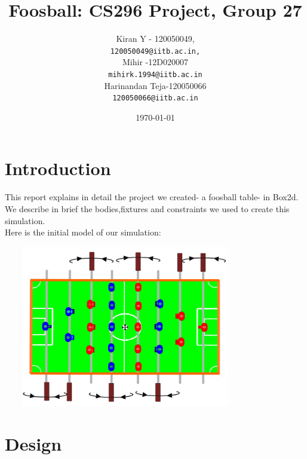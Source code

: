 \documentclass{article}
\begin{document}
\nocite{*}

\title{Foosball: CS296 Project, Group 27}

\author{
Kiran Y - 120050049,\\
\texttt{120050049@iitb.ac.in,}\\
Mihir -12D020007\\
\texttt{mihirk.1994@iitb.ac.in}\\
Harinandan Teja-120050066\\
\texttt{120050066@iitb.ac.in}\\
}
\date{\today}

\maketitle

\section{Introduction}
This report explains in detail the project we created- a foosball table- in Box2d. We describe in brief the bodies,fixtures and constraints we used to create this simulation.\\
Here is the initial model of our simulation:\\
\begin{center}
\includegraphics[width=300pt,height=200pt]{foosball}
\end{center}
\section{Design}
\end{document}
